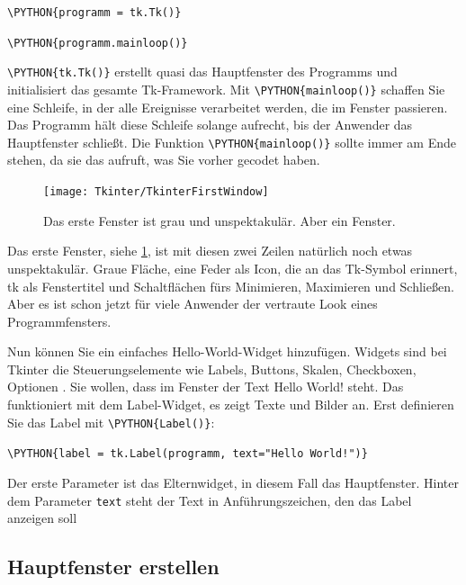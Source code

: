 \medskip

\texttt{\textbackslash PYTHON\{programm = tk.Tk()\}}

\texttt{\textbackslash PYTHON\{programm.mainloop()\}}

\medskip

\texttt{\textbackslash PYTHON\{tk.Tk()\}} erstellt quasi das Hauptfenster des Programms und initialisiert das gesamte Tk-Framework. Mit \texttt{\textbackslash PYTHON\{mainloop()\}} schaffen Sie eine Schleife, in der alle Ereignisse verarbeitet werden, die im Fenster passieren. Das Programm hält diese Schleife solange aufrecht, bis der Anwender das Hauptfenster schließt. Die Funktion \texttt{\textbackslash PYTHON\{mainloop()\}} sollte immer am Ende stehen, da sie das aufruft, was Sie vorher gecodet haben.

\begin{figure}
	\texttt{[image: Tkinter/TkinterFirstWindow]}
	\caption{Das erste Fenster ist grau und unspektakulär. Aber ein Fenster.} \label{TkinterFirstWindow}
\end{figure}

Das erste Fenster, siehe \ref{TkinterFirstWindow}, ist mit diesen zwei Zeilen natürlich noch etwas unspektakulär. Graue Fläche, eine Feder als Icon, die an das Tk-Symbol erinnert, tk als Fenstertitel und Schaltflächen fürs Minimieren, Maximieren und Schließen. Aber es ist schon jetzt für viele Anwender der vertraute Look eines Programmfensters.

Nun können Sie ein einfaches Hello-World-Widget hinzufügen. Widgets sind bei Tkinter die Steuerungselemente wie Labels, Buttons, Skalen, Checkboxen, Optionen . Sie wollen, dass im Fenster der Text Hello World! steht. Das funktioniert mit dem Label-Widget, es zeigt Texte und Bilder an. Erst definieren Sie das Label mit \texttt{\textbackslash PYTHON\{Label()\}}:

\medskip

\texttt{\textbackslash PYTHON\{label = tk.Label(programm, text="Hello World!")\}}

\medskip

Der erste Parameter ist das Elternwidget, in diesem Fall das Hauptfenster. Hinter dem Parameter \texttt{text} steht der Text in Anführungszeichen, den das Label anzeigen soll

\subsection{Hauptfenster erstellen}

